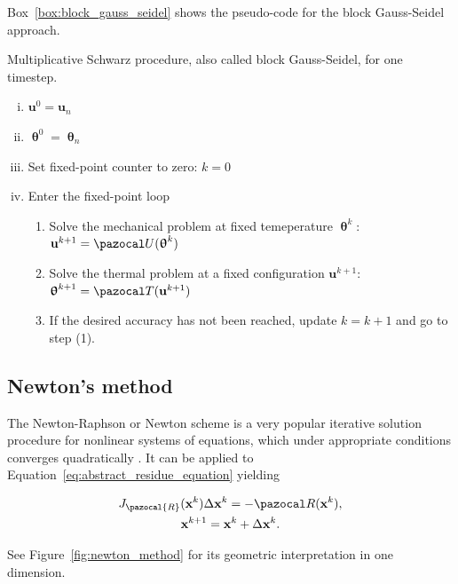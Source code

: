 Box~\ref{box:block_gauss_seidel} shows the pseudo-code for the block Gauss-Seidel approach.

\begin{framedbox}[htb]
  \caption{Multiplicative Schwarz procedure, also called block Gauss-Seidel, for one timestep.}
  \label{box:block_gauss_seidel}
  \begin{center}
    \begin{minipage}{0.9\textwidth}
    \begin{enumerate}[(i)]
    \item \(\mathbf u^0 = \mathbf u_{n}\)
    \item \(\bm \uptheta^0 = \bm \uptheta_n\)
      \item Set fixed-point counter to zero: \(k=0\)
    \item Enter the fixed-point loop
    \begin{enumerate}[(1)]
      \item Solve the mechanical problem at fixed temeperature \(\bm \uptheta^k\): \(\mathbf u^{k+1} = \pazocal U(\bm \uptheta^k)\)
      \item Solve the thermal problem at a fixed configuration \(\mathbf u^{k+1}\): \(\bm \uptheta^{k+1} = \pazocal T(\mathbf u^{k+1})\)
      \item If the desired accuracy has not been reached, update \(k=k+1\) and go to step (1).

    \end{enumerate}
    \end{enumerate}
    \end{minipage}
  \end{center}
\end{framedbox}

\subsection{Newton's method} \label{sec:newtons_method}

The Newton-Raphson or Newton scheme is a very popular iterative solution procedure for nonlinear systems of equations, which under appropriate conditions converges quadratically \citep{dennis_numerical_1996, kelley_solving_2003}.
It can be applied to Equation~\eqref{eq:abstract_residue_equation} yielding
\begin{highlight}[innertopmargin=-5pt]
  \begin{gather}
    J_\pazocal{R}(\mathbf x^k)\Delta \mathbf x^k = - \pazocal R(\mathbf x^k), \label{eq:newton_system}\\
    \mathbf x^{k+1} = \mathbf x^k + \Delta \mathbf x^k. \label{eq:newton_iter}
  \end{gather}
\end{highlight}
See Figure~\ref{fig:newton_method} for its geometric interpretation in one dimension.

